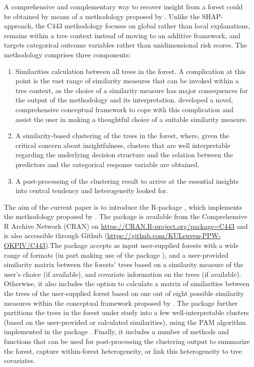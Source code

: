 A comprehensive and complementary way to recover insight from a forest could be obtained by means of a methodology proposed by \citet{Sies2020}. Unlike the SHAP-approach, the C443 methodology focuses on global rather than local explanations, remains within a tree context instead of moving to an additive framework, and targets categorical outcome variables rather than unidimensional risk scores. The methodology comprises three components:
\begin{enumerate}
\item{Similarities calculation between all trees in the forest. A complication at this point is the vast range of similarity measures that can be invoked within a tree context, as the choice of a similarity measure has major consequences for the output of the methodology and its interpretation. \citet{Sies2020} developed a novel, comprehensive conceptual framework to cope with this complication and assist the user in making a thoughtful choice of a suitable similarity measure.}
\item{A similarity-based clustering of the trees in the forest, where, given the critical concern about insightfulness, clusters that are well interpretable regarding the underlying decision structure and the relation between the predictors and the categorical response variable are obtained.}
\item{A post-processing of the clustering result to arrive at the essential insights into central tendency and heterogeneity looked for.}
\end{enumerate}

The aim of the current paper is to introduce the R-package , which implements the methodology proposed by \citet{Sies2020}. The package is available from the Comprehensive R Archive Network (CRAN) on \url{https://CRAN.R-project.org/package=C443} and is also accessible through Github (\url{https://github.com/KULeuven-PPW-OKPIV/C443}).The package accepts as input user-supplied forests with a wide range of formats (in part making use of the  package \citep{Hothornb2015}), and a user-provided similarity matrix between the forests' trees based on a similarity measure of the user's choice (if available), and covariate information on the trees (if available). Otherwise, it  also includes the option to calculate a matrix of similarities between the trees of the user-supplied forest based on one out of eight possible similarity measures within the conceptual framework proposed by \citet{Sies2020}. The package further partitions the trees in the forest under study into a few well-interpretable clusters (based on the user-provided or calculated similarities), using the PAM algorithm \citep{Kaufman2009} implemented in the  package \citep{Maechler2019}. Finally, it includes a number of methods and functions that can be used for post-processing the clustering output to summarize the forest, capture within-forest heterogeneity, or link this heterogeneity to tree covariates.


